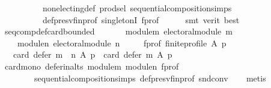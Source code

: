 \begin{isabellebody}
\ \ \ \ \ \ \ \ \ \ non{\isacharunderscore}{\kern0pt}electing{\isacharunderscore}{\kern0pt}def\ prod{\isachardot}{\kern0pt}sel\ sequential{\isacharunderscore}{\kern0pt}composition{\isachardot}{\kern0pt}simps\isanewline
\ \ \ \ \ \ \ \ \ \ def{\isacharunderscore}{\kern0pt}presv{\isacharunderscore}{\kern0pt}fin{\isacharunderscore}{\kern0pt}prof\ singletonI\ f{\isacharunderscore}{\kern0pt}prof\isanewline
\ \ \ \ \isamarkupfalse%
\ {\isacharparenleft}{\kern0pt}smt\ {\isacharparenleft}{\kern0pt}verit{\isacharcomma}{\kern0pt}\ best{\isacharparenright}{\kern0pt}{\isacharparenright}{\kern0pt}\isanewline
{}\isamarkupfalse%
%
\endisatagproof
{\isafoldproof}%
%
\isadelimproof
\isanewline
%
\endisadelimproof
\isanewline
{}\isamarkupfalse%
\ seq{\isacharunderscore}{\kern0pt}comp{\isacharunderscore}{\kern0pt}def{\isacharunderscore}{\kern0pt}card{\isacharunderscore}{\kern0pt}bounded{\isacharcolon}{\kern0pt}\isanewline
\ \ \isanewline
\ \ \ \ module{\isacharunderscore}{\kern0pt}m{\isacharcolon}{\kern0pt}\ {\isachardoublequoteopen}electoral{\isacharunderscore}{\kern0pt}module\ m{\isachardoublequoteclose}\ \isanewline
\ \ \ \ module{\isacharunderscore}{\kern0pt}n{\isacharcolon}{\kern0pt}\ {\isachardoublequoteopen}electoral{\isacharunderscore}{\kern0pt}module\ n{\isachardoublequoteclose}\ \isanewline
\ \ \ \ f{\isacharunderscore}{\kern0pt}prof{\isacharcolon}{\kern0pt}\ {\isachardoublequoteopen}finite{\isacharunderscore}{\kern0pt}profile\ A\ p{\isachardoublequoteclose}\isanewline
\ \ \ {\isachardoublequoteopen}card\ {\isacharparenleft}{\kern0pt}defer\ {\isacharparenleft}{\kern0pt}m\ {\isasymtriangleright}\ n{\isacharparenright}{\kern0pt}\ A\ p{\isacharparenright}{\kern0pt}\ {\isasymle}\ card\ {\isacharparenleft}{\kern0pt}defer\ m\ A\ p{\isacharparenright}{\kern0pt}{\isachardoublequoteclose}\isanewline
%
\isadelimproof
\ \ %
\endisadelimproof
%
\isatagproof
{}\isamarkupfalse%
\ card{\isacharunderscore}{\kern0pt}mono\ defer{\isacharunderscore}{\kern0pt}in{\isacharunderscore}{\kern0pt}alts\ module{\isacharunderscore}{\kern0pt}m\ module{\isacharunderscore}{\kern0pt}n\ f{\isacharunderscore}{\kern0pt}prof\isanewline
\ \ \ \ \ \ \ \ sequential{\isacharunderscore}{\kern0pt}composition{\isachardot}{\kern0pt}simps\ def{\isacharunderscore}{\kern0pt}presv{\isacharunderscore}{\kern0pt}fin{\isacharunderscore}{\kern0pt}prof\ snd{\isacharunderscore}{\kern0pt}conv\isanewline
\ \ \isamarkupfalse%
\ metis%
\endisatagproof
{\isafoldproof}%
%
\isadelimproof

\end{isabellebody}

